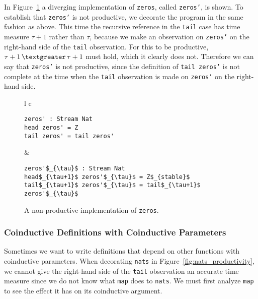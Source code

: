 In Figure~\ref{fig:zerosprime} a diverging implementation of \texttt{zeros}, called \texttt{zeros'}, is shown. To establish that \texttt{zeros'} is not productive, we decorate the program in the same fashion as above. This time the recursive reference in the \texttt{tail} case has time measure $\tau+1$ rather than $\tau$, because we make an observation on \texttt{zeros'} on the right-hand side of the \texttt{tail} observation. For this to be productive, $\tau+1\,\textgreater\,\tau+1$ must hold, which it clearly does not. Therefore we can say that \texttt{zeros'} is not productive, since the definition of \texttt{tail zeros'} is not complete at the time when the \texttt{tail} observation is made on \texttt{zeros'} on the right-hand side.

\begin{figure}
\begin{tabular}{l c}

\begin{minipage}{3in}
\begin{Verbatim}[commandchars=\\\{\},codes={\catcode`$=3\catcode`_=8}]
zeros' : Stream Nat
head zeros' = Z
tail zeros' = tail zeros'
\end{Verbatim}
\end{minipage} &
\begin{minipage}{3in}
\begin{Verbatim}[commandchars=\\\{\},codes={\catcode`$=3\catcode`_=8}]
zeros'$_{\tau}$ : Stream Nat
head$_{\tau+1}$ zeros'$_{\tau}$ = Z$_{stable}$
tail$_{\tau+1}$ zeros'$_{\tau}$ = tail$_{\tau+1}$ zeros'$_{\tau}$
\end{Verbatim}
\end{minipage}

\end{tabular}
\caption{A non-productive implementation of \texttt{zeros}.}
\label{fig:zerosprime}
\end{figure}

\subsubsection{Coinductive Definitions with Coinductive Parameters}

Sometimes we want to write definitions that depend on other functions with coinductive parameters. When decorating \texttt{nats} in Figure~\ref{fig:nats_productivity}, we cannot give the right-hand side of the \texttt{tail} observation an accurate time measure since we do not know what \texttt{map} does to \texttt{nats}. We must first analyze \texttt{map} to see the effect it has on its coinductive argument.


